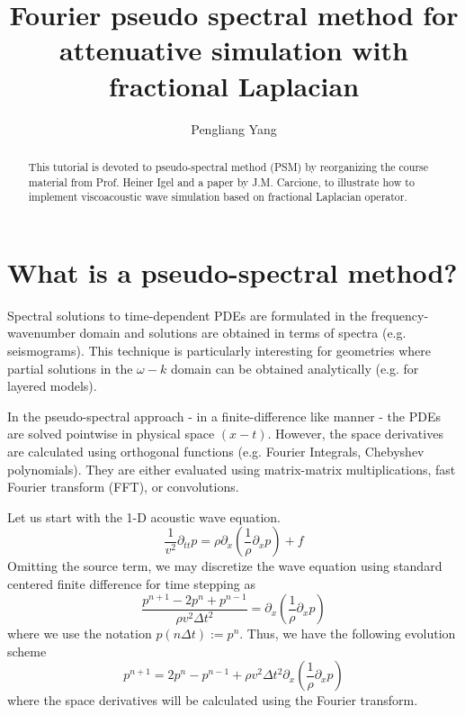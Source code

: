 \title{Fourier pseudo spectral method for attenuative simulation with fractional Laplacian}

\renewcommand{\thefootnote}{\fnsymbol{footnote}}
\author{Pengliang Yang}
\address{ISTerre, Univ. Grenoble Alpes}




\maketitle


\begin{abstract}
This tutorial is devoted to pseudo-spectral method (PSM) by reorganizing the course material from Prof. Heiner Igel and a paper by J.M. Carcione, to illustrate how to implement viscoacoustic wave simulation based on fractional Laplacian operator. 
\end{abstract}

\section{What is a pseudo-spectral method?}


Spectral solutions to time-dependent PDEs are formulated in the frequency-wavenumber domain and solutions are obtained in terms of spectra (e.g. seismograms). This
technique is particularly interesting for geometries where partial solutions in the $\omega-k$ domain can be obtained analytically (e.g. for layered models).

In the pseudo-spectral approach - in a finite-difference like manner - the PDEs are solved pointwise in physical space $(x-t)$. However, the space derivatives are calculated using
orthogonal functions (e.g. Fourier Integrals, Chebyshev polynomials). They are either evaluated using matrix-matrix multiplications, fast Fourier transform (FFT), or convolutions.

Let us start with the 1-D acoustic wave equation.
\begin{equation}
 \frac{1}{v^2}\partial_{tt}p=\rho\partial_x\left(\frac{1}{\rho}\partial_x p\right)+f
\end{equation}
Omitting the source term, we may discretize the wave equation using standard centered finite difference for time stepping as
\begin{equation} 
\frac{p^{n+1}-2p^n+p^{n-1}}{\rho v^2\Delta t^2}=\partial_x\left(\frac{1}{\rho}\partial_x p\right)
\end{equation}
where we use the notation $p(n\Delta t):=p^n$. Thus, we have the following evolution scheme
\begin{equation}
 p^{n+1}=2p^n-p^{n-1}+\rho v^2\Delta t^2 \partial_x\left(\frac{1}{\rho}\partial_x p\right)
\end{equation}
where the space derivatives will be calculated using the Fourier transform.

